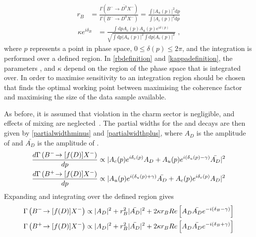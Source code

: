 \begin{align}
r_B &= \frac{\Gamma(B^- \to \bar{D^0}X^-)}{\Gamma(B^- \to D^0X^-)} = \frac{\int \left|A_u(p)\right|^2 \mathrm{d}p}{\int \left|A_c(p)\right|^2 \mathrm{d}p}
\label{rbdefinition}
\end{align}
\begin{align}
\kappa e^{i\delta_B} &= \frac{\int \mathrm{d}p A_c(p)A_u(p)e^{i\delta(p)}}{\sqrt{\int \mathrm{d}p \left|A_u(p)\right|^2 \int \mathrm{d}p \left|A_c(p)\right|^2}} \text{ ,}
\label{kappadefinition}
\end{align}
where $p$ represents a point in phase space, $0 \leq \delta(p) \leq 2\pi$, and the integration is performed over a defined \Kstarm region. In \eqns\ref{rbdefinition} and \ref{kappadefinition}, the parameters \rb, \deltab and $\kappa$ depend on the region of the \decay{\Bm}{\D\KS\pim} phase space that is integrated over. In order to maximise sensitivity to \Pgamma an integration region should be chosen that finds the optimal working point between maximising the coherence factor and maximising the size of the data sample available.

As before, it is assumed that \CP violation in the charm sector is negligible, and effects of \D mixing are neglected~\cite{charmcpv,charmmixing}. The partial widths for the \Bm and \Bp decays are then given by \eqns\ref{partialwidthminus} and \ref{partialwidthplus}, where $A_D$ is the amplitude of  and $\bar{A_{D}}$ is the amplitude of .
\begin{align}
\frac{d\Gamma\left({{{B}^-}}\!\rightarrow [f(D)]X^-\right)}{dp} &\propto | A_c(p) e^{i\delta_c(p)}A_{D} + A_u(p) e^{i(\delta_u(p) - \gamma)}\bar{A_{D}} |^2 \label{partialwidthminus} \\
\frac{d\Gamma\left({{{B}^+}}\!\rightarrow [f(D)]X^-\right)}{dp} &\propto | A_u(p) e^{i(\delta_u(p) + \gamma)}\bar{A_{D}} + A_c(p) e^{i\delta_c(p)}A_{D} |^2 \label{partialwidthplus}
\end{align}
Expanding and integrating over the defined \Kstar region gives
\begin{align}
\Gamma\left({{{B}^-}}\!\rightarrow [f(D)]X^-\right) &\propto |A_D|^2 + r_B^2 |\bar{A_{D}}|^2 + 2\kappa r_B Re\left[ A_D \bar{A_{D}} e^{-i(\delta_B - \gamma)} \right] \label{BandDdecaysminus} \\
\Gamma\left({{{B}^+}}\!\rightarrow [f(D)]X^-\right) &\propto |A_D|^2 + r_B^2 |\bar{A_{D}}|^2 + 2\kappa r_B Re\left[ A_D \bar{A_{D}} e^{-i(\delta_B + \gamma)} \right] \label{BandDdecaysplus}
\end{align}

